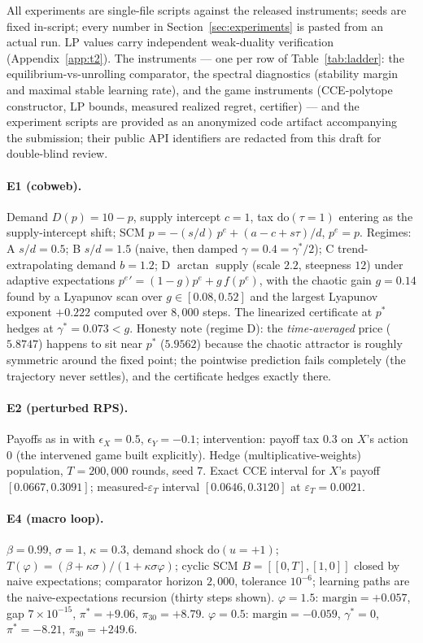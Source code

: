 \documentclass[pmlr]{jmlr}
\newcommand{\doop}{\mathrm{do}}
\newcommand{\margin}{\mathrm{margin}}
\newcommand{\gstar}{\gamma^{*}}
\begin{document}
All experiments are single-file scripts against the released instruments; seeds are fixed
in-script; every number in Section~\ref{sec:experiments} is pasted from an actual run. LP values
carry independent weak-duality verification (Appendix~\ref{app:t2}). The instruments --- one per
row of Table~\ref{tab:ladder}: the equilibrium-vs-unrolling comparator, the spectral diagnostics
(stability margin and maximal stable learning rate), and the game instruments (CCE-polytope
constructor, LP bounds, measured realized regret, certifier) --- and the experiment scripts are
provided as an anonymized code artifact accompanying the submission; their public API
identifiers are redacted from this draft for double-blind review.

\paragraph{E1 (cobweb).} Demand $D(p) = 10 - p$, supply intercept $c = 1$, tax
$\doop(\tau{=}1)$ entering as the supply-intercept shift; SCM
$p = -(s/d)\,p^e + (a - c + s\tau)/d$, $p^e = p$. Regimes: A $s/d = 0.5$; B $s/d = 1.5$ (naive,
then damped $\gamma = 0.4 = \gstar/2$); C trend-extrapolating demand $b = 1.2$; D
$\arctan$ supply (scale $2.2$, steepness $12$) under adaptive expectations
$p^e{}' = (1-g)p^e + g\,f(p^e)$, with the chaotic gain $g = 0.14$ found by a Lyapunov scan over
$g \in [0.08, 0.52]$ and the largest Lyapunov exponent $+0.222$ computed over $8{,}000$ steps.
The linearized certificate at $p^*$ hedges at $\gstar = 0.073 < g$. Honesty note (regime D): the
\emph{time-averaged} price ($5.8747$) happens to sit near $p^*$ ($5.9562$) because the chaotic
attractor is roughly symmetric around the fixed point; the pointwise prediction fails completely
(the trajectory never settles), and the certificate hedges exactly there.

\paragraph{E2 (perturbed RPS).} Payoffs as in \citet{sato2002chaos} with
$\epsilon_X = 0.5$, $\epsilon_Y = -0.1$; intervention: payoff tax $0.3$ on $X$'s action $0$
(the intervened game built explicitly). Hedge (multiplicative-weights) population,
$T = 200{,}000$ rounds, seed $7$. Exact CCE interval for $X$'s payoff $[0.0667, 0.3091]$;
measured-$\varepsilon_T$ interval $[0.0646, 0.3120]$ at $\varepsilon_T = 0.0021$.

\paragraph{E4 (macro loop).} $\beta = 0.99$, $\sigma = 1$, $\kappa = 0.3$, demand shock
$\doop(u{=}{+}1)$; $T(\varphi) = (\beta + \kappa\sigma)/(1 + \kappa\sigma\varphi)$; cyclic SCM
$B = [[0, T], [1, 0]]$ closed by naive expectations; comparator horizon $2{,}000$, tolerance
$10^{-6}$; learning paths are the naive-expectations recursion (thirty steps shown).
$\varphi = 1.5$: $\margin = +0.057$, gap $7 \times 10^{-15}$, $\pi^* = +9.06$, $\pi_{30} = +8.79$.
$\varphi = 0.5$: $\margin = -0.059$, $\gstar = 0$, $\pi^* = -8.21$, $\pi_{30} = +249.6$.
\end{document}
